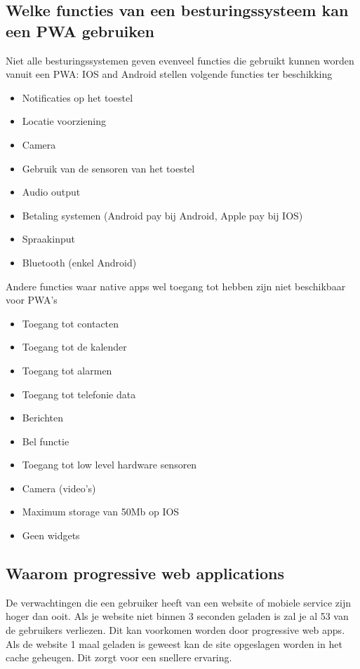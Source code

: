 \subsection{Welke functies van een besturingssysteem kan een PWA gebruiken}
Niet alle besturingssystemen geven evenveel functies die gebruikt kunnen worden vanuit een PWA: IOS and Android stellen volgende functies ter beschikking
\begin{itemize}
    \item Notificaties op het toestel
    \item Locatie voorziening
    \item Camera
    \item Gebruik van de sensoren van het toestel
    \item Audio output
    \item Betaling systemen (Android pay bij Android, Apple pay bij IOS)
    \item Spraakinput
    \item Bluetooth (enkel Android)
\end{itemize}
Andere functies waar native apps wel toegang tot hebben zijn niet beschikbaar voor PWA's
\begin{itemize}
    \item Toegang tot contacten
    \item Toegang tot de kalender
    \item Toegang tot alarmen
    \item Toegang tot telefonie data
    \item Berichten
    \item Bel functie
    \item Toegang tot low level hardware sensoren
    \item Camera (video’s)
    \item Maximum storage van 50Mb op IOS
    \item Geen widgets
\end{itemize}

\autocite{Malavolta2016}
\autocite{Destrebecq2018}

\subsection{Waarom progressive web applications}

De verwachtingen die een gebruiker heeft van een website of mobiele service zijn hoger dan ooit. Als je website niet binnen 3 seconden geladen is zal je al 53%
van de gebruikers verliezen. Dit kan voorkomen worden door progressive web apps. Als de website 1 maal geladen is geweest kan de site opgeslagen worden in het cache geheugen. Dit zorgt voor een snellere ervaring.
\autocite{Google2017}

